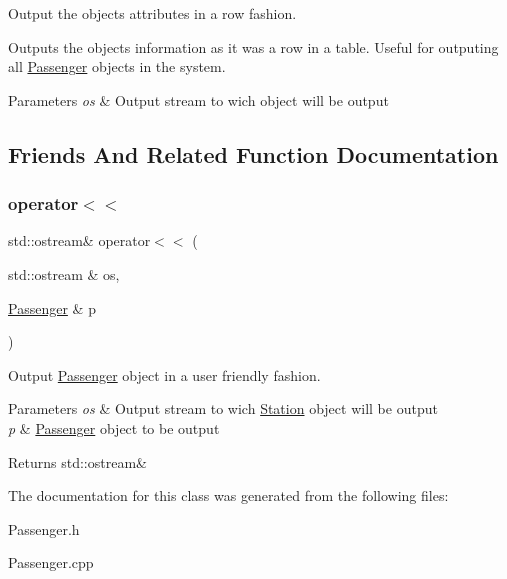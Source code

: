 Output the object\textquotesingle{}s attributes in a row fashion. 

Outputs the object\textquotesingle{}s information as it was a row in a table. Useful for outputing all \mbox{\hyperlink{classPassenger}{Passenger}} objects in the system.


\begin{DoxyParams}{Parameters}
{\em os} & Output stream to wich object will be output \\
\hline
\end{DoxyParams}


\subsection{Friends And Related Function Documentation}
\mbox{\label{classPassenger_a7b1aeaded08562578690b788f39db888}} 
\subsubsection{\texorpdfstring{operator$<$$<$}{operator<<}}
{\footnotesize\ttfamily std\+::ostream\& operator$<$$<$ (\begin{DoxyParamCaption}\item[{std\+::ostream \&}]{os,  }\item[{\mbox{\hyperlink{classPassenger}{Passenger}} \&}]{p }\end{DoxyParamCaption})\hspace{0.3cm}{\ttfamily [friend]}}



Output \mbox{\hyperlink{classPassenger}{Passenger}} object in a user friendly fashion. 


\begin{DoxyParams}{Parameters}
{\em os} & Output stream to wich \mbox{\hyperlink{classStation}{Station}} object will be output \\
\hline
{\em p} & \mbox{\hyperlink{classPassenger}{Passenger}} object to be output \\
\hline
\end{DoxyParams}
\begin{DoxyReturn}{Returns}
std\+::ostream\& 
\end{DoxyReturn}


The documentation for this class was generated from the following files\+:\begin{DoxyCompactItemize}
\item 
Passenger.\+h\item 
Passenger.\+cpp\end{DoxyCompactItemize}
